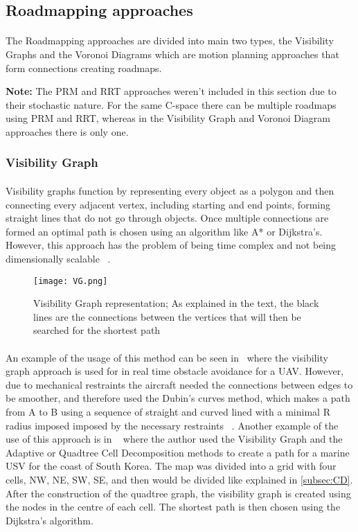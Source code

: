 \subsection{Roadmapping approaches}
\label{subsec:RA}
\paragraph{}The Roadmapping approaches are divided into main two types, the Visibility Graphs and the Voronoi Diagrams which are motion planning approaches
that form connections creating roadmaps. 

\textbf{Note:} The \gls{PRM} and \gls{RRT} approaches weren't included in this section due to their stochastic nature. For the same C-space there
can be multiple roadmaps using PRM and \gls{RRT}, whereas in the Visibility Graph and Voronoi Diagram approaches there is only one.
\subsubsection{Visibility Graph}
\label{subsubsec:VG}
\paragraph{}Visibility graphs function by
representing every object as a polygon and then connecting every adjacent vertex, including starting and end points, 
forming straight lines that do not go through objects. Once multiple connections are formed an optimal path is chosen using an algorithm like A* or 
Dijkstra's. However, this approach has the problem of being time complex and not being dimensionally scalable ~\cite{sym10100450}. 
\begin{figure}
    \centering
    \texttt{[image: VG.png]}
    \caption{Visibility Graph representation; As explained in the text, the black lines are the connections between the vertices that will then be searched for the shortest path}
    \label{fig:VG}
\end{figure}

\paragraph{}An example of the usage of this method can be seen in~\cite{app10165613} where the visibility graph approach is used for in real time
obstacle avoidance for a \gls{UAV}. However, due to mechanical restraints the aircraft needed the connections between edges to be smoother, and therefore
used the Dubin's curves method, which makes a path from A to B using a sequence of straight and curved lined with a minimal R radius imposed
imposed by the necessary restraints ~\cite{aac5c909-7434-3d95-961b-caf3aec6a743}.
Another example of the use of this approach is in ~\cite{LEE2021102887} where the author used the Visibility Graph and the Adaptive or Quadtree Cell Decomposition
methods  to create a path for a marine USV for the coast of South Korea. The map was divided into a grid with four cells, NW, NE, SW, SE, and then would
be divided like explained in \ref{subsec:CD}. After the construction of the quadtree graph, the visibility graph is created using
the nodes in the centre of each cell. The shortest path is then chosen using the Dijkstra's algorithm.

